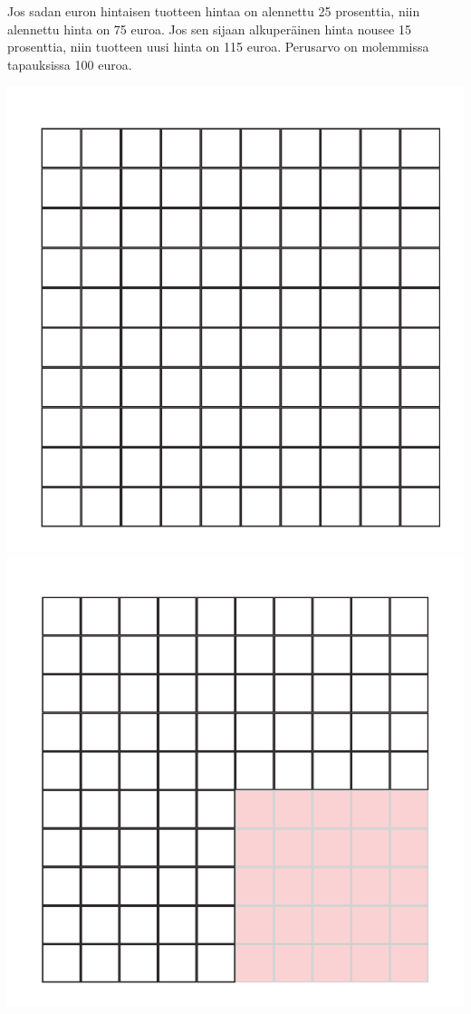 \begin{esimerkki}
Jos sadan euron hintaisen tuotteen hintaa on alennettu 25 prosenttia, niin alennettu hinta on 75 euroa. Jos sen sijaan alkuperäinen hinta nousee 15 prosenttia, niin tuotteen uusi hinta on 115 euroa. Perusarvo on molemmissa tapauksissa 100 euroa.


\begin{center}
 \includegraphics[scale=.25]{02-yhtalot/kuvia/Kuva13-1-100.pdf}
 \includegraphics[scale=.25]{02-yhtalot/kuvia/Kuva13-2-75.pdf}

\end{center}
\end{esimerkki}
